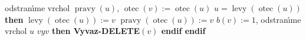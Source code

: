 \documentclass[a4paper,12pt]{article}
\DeclareMathOperator*{\otec}{otec}
\DeclareMathOperator*{\levy}{levy}
\DeclareMathOperator*{\pravy}{pravy}
\begin{document}
\phantom{------}odstran\'\i me vrchol $\pravy(u)$, $\otec(v):=\otec(u)$\newline
\phantom{------}{\bf if} $u=\levy(\otec(u))$ {\bf then}\newline 
\phantom{---------}$\levy(\otec(u)):=v$\newline 
\phantom{------}{\bf else}\newline 
\phantom{---------}$\pravy(\otec(u)):=v$\newline 
\phantom{------}{\bf endif}\newline 
\phantom{------}$b(v):=1$, odstran\'\i me vrchol $u$\newline 
\phantom{---}{\bf endif} \newline 
\phantom{---}{\bf if} $vyv$ {\bf then Vyvaz-DELETE$(v)$ endif\newline 
endif}
\medskip
\end{document}
